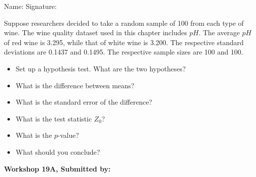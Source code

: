 \documentclass[11pt]{book}\usepackage[]{graphicx}\usepackage[]{color}
\begin{document}
\begin{exercises}
\begin{exercise}
\begin{center}
{{\vspace{4mm}
Name: \underline{\phantom{xxxxxxxxxxxxxxxxxxxxxxxx}} Signature: \underline{\phantom{xxxxxxxxxxxxxxxxxxxxxxxx}}
 }}
\end{center}   %

Suppose researchers decided to take a random sample of 100 from each type of wine.  The wine quality dataset used in this chapter includes $pH$. The average $pH$ of red wine is 3.295, while that of white wine is 3.200. The respective standard deviations are 0.1437 and 0.1495. The respective sample sizes are 100 and 100.

\begin{itemize}
  \item Set up a hypothesis test. What are the two hypotheses?
  \item What is the difference between means?
  \item What is the standard error of the difference?
  \item What is the test statistic $Z_0$?
  \item What is the $p$-value?
  \item What should you conclude?
\end{itemize}

\end{exercise}
\begin{solution}  %


\end{solution}


\clearpage

    \begin{exercise}  %

    \begin{center}
\begin{flushleft}\textbf{\large \hfill Workshop 19A, Submitted by: }\end{flushleft}


\end{center}
\end{exercise}
\end{exercises}
\end{document}
